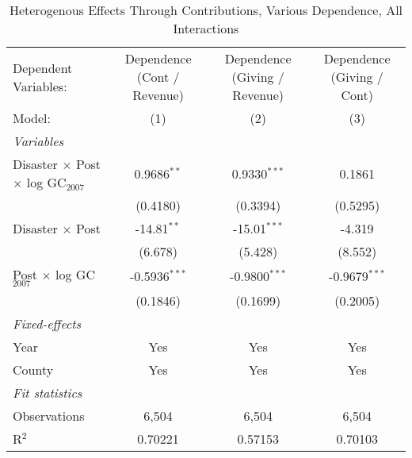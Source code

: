 
\begin{table}[htbp]
   \caption{Heterogenous Effects Through Contributions, Various Dependence, All Interactions}
   \centering
   \begin{adjustbox}{max width = \textwidth, center}
      \begin{tabular}{lccc}
         \tabularnewline \midrule \midrule
         Dependent Variables:                              & Dependence (Cont / Revenue) & Dependence (Giving / Revenue) & Dependence (Giving / Cont)\\  
         Model:                                            & (1)                         & (2)                           & (3)\\  
         \midrule
         \emph{Variables}\\
         Disaster $\times$ Post $\times$ log GC$_{2007}$   & 0.9686$^{**}$               & 0.9330$^{***}$                & 0.1861\\   
                                                           & (0.4180)                    & (0.3394)                      & (0.5295)\\   
         Disaster $\times$ Post                            & -14.81$^{**}$               & -15.01$^{***}$                & -4.319\\   
                                                           & (6.678)                     & (5.428)                       & (8.552)\\   
         Post $\times$ log GC$_{2007}$                     & -0.5936$^{***}$             & -0.9800$^{***}$               & -0.9679$^{***}$\\   
                                                           & (0.1846)                    & (0.1699)                      & (0.2005)\\   
         \midrule
         \emph{Fixed-effects}\\
         Year                                              & Yes                         & Yes                           & Yes\\  
         County                                            & Yes                         & Yes                           & Yes\\  
         \midrule
         \emph{Fit statistics}\\
         Observations                                      & 6,504                       & 6,504                         & 6,504\\  
         R$^2$                                             & 0.70221                     & 0.57153                       & 0.70103\\  

\end{tabular}
\end{adjustbox}
\end{table}
